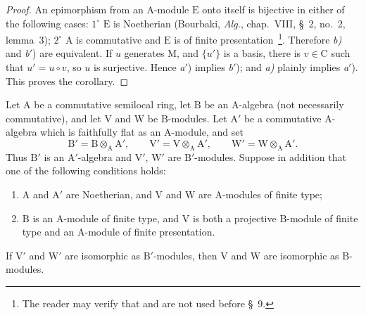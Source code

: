\begin{proof}
An epimorphism from an $\mathrm{A}$-module $\mathrm{E}$ onto itself is
bijective in either of the following cases: \(1^\circ\) $\mathrm{E}$ is
Noetherian (Bourbaki, \emph{Alg.}, chap.~VIII, \S~2, no.~2, lemma~3);
\(2^\circ\) $\mathrm{A}$ is commutative and $\mathrm{E}$ is of finite
presentation~\footnote{The reader may verify that
 and  are not used before \S~9.}.
  Therefore \emph{b)} and \emph{b}$'$) are equivalent. If $u$ generates
  $\mathrm{M}$,
  and $\{u'\}$ is a basis, there is $v\in\mathrm{C}$ such
  that $u'=u\circ v$, so $u$ is surjective. Hence \emph{a}$'$) implies
  \emph{b}$'$); and \emph{a)} plainly implies \emph{a}$'$). This proves
  the corollary.
\end{proof}

\begin{proposition}[2.5.8]
\label{IV.2.5.8}
Let $\mathrm{A}$ be a commutative semilocal ring, let $\mathrm{B}$ be an
$\mathrm{A}$-algebra \textnormal{(}not necessarily
commutative\textnormal{)}, and let $\mathrm{V}$ and $\mathrm{W}$ be
$\mathrm{B}$-modules. Let $\mathrm{A}'$ be a commutative
$\mathrm{A}$-algebra which is faithfully flat as an $\mathrm{A}$-module,
and set
\[
  \mathrm{B}'=\mathrm{B}\otimes_{\mathrm{A}}\mathrm{A}',\qquad
  \mathrm{V}'=\mathrm{V}\otimes_{\mathrm{A}}\mathrm{A}',\qquad
  \mathrm{W}'=\mathrm{W}\otimes_{\mathrm{A}}\mathrm{A}'.
\]
Thus $\mathrm{B}'$ is an $\mathrm{A}'$-algebra and $\mathrm{V}'$,
$\mathrm{W}'$ are $\mathrm{B}'$-modules. Suppose in addition that one of
the following conditions holds:
\begin{enumerate}
  \item[(i)] $\mathrm{A}$ and $\mathrm{A}'$ are Noetherian, and
  $\mathrm{V}$ and $\mathrm{W}$ are $\mathrm{A}$-modules of finite type;
  \item[(ii)] $\mathrm{B}$ is an $\mathrm{A}$-module of finite type, and
  $\mathrm{V}$ is both a projective $\mathrm{B}$-module of finite type
  and an $\mathrm{A}$-module of finite presentation.
\end{enumerate}
If $\mathrm{V}'$ and $\mathrm{W}'$ are isomorphic as
$\mathrm{B}'$-modules, then $\mathrm{V}$ and $\mathrm{W}$ are isomorphic
as $\mathrm{B}$-modules.
\end{proposition}

